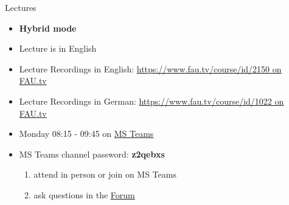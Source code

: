 \begin{frame}
\begin{columns}[c, onlytextwidth]
\begin{column}{0.3\textwidth}
		\end{column}
	\end{columns}
\end{frame}

\begin{frame}[c]{Lectures}
	\begin{itemize}
		\setlength\itemsep{0.4cm}
		\item \textbf{Hybrid mode}
		\item Lecture is in English
		\item Lecture Recordings in English: \href{https://www.fau.tv/course/id/2150}{https://www.fau.tv/course/id/2150 on FAU.tv}
		\item Lecture Recordings in German: \href{https://www.fau.tv/course/id/1022}{https://www.fau.tv/course/id/1022 on FAU.tv}
		\item Monday 08:15 - 09:45 on \href{https://teams.microsoft.com/l/team/19\%3adRCxup9jUsjM31xr9T4jdAFDB-ImEk_lU5Fy05ijYx81\%40thread.tacv2/conversations?groupId=6b2df36b-cec0-46b3-83d2-b4e6d1c6ac30\&tenantId=b2efcef3-8496-40b8-9de8-f135982f3461}{MS Teams}
		\item MS Teams channel password: \textbf{z2qebxs}
		\begin{enumerate}
			\item attend in person or join on MS Teams
			\item ask questions in the \href{https://www.studon.fau.de/studon/goto.php?target=frm_4685856}{Forum}
		\end{enumerate}
	\end{itemize}
\end{frame}

